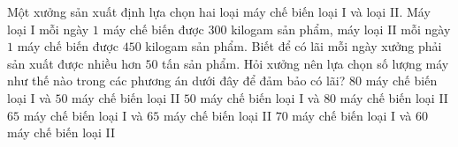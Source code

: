 \begin{ex}%
Một xưởng sản xuất định lựa chọn hai loại máy chế biến loại I và loại II. Máy loại I mỗi ngày $1$ máy chế biến được $300$ kilogam sản phẩm, máy loại II mỗi ngày $1$ máy chế biến được $450$ kilogam sản phẩm. Biết để có lãi mỗi ngày xưởng phải sản xuất được nhiều hơn $50$ tấn sản phẩm. Hỏi xưởng nên lựa chọn số lượng máy như thế nào trong các phương án dưới đây để đảm bảo có lãi? 
\choice
{$80$ máy chế biến loại I và $50$ máy chế biến loại II}
{\True $50$ máy chế biến loại I và $80$ máy chế biến loại II}
{$65$ máy chế biến loại I và $65$ máy chế biến loại II}
{$70$ máy chế biến loại I và $60$ máy chế biến loại II}
\end{ex}
